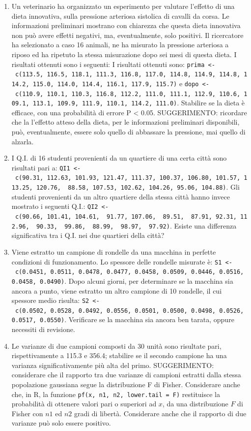 \documentclass[
  12pt,
]{book}
\begin{document}
\begin{enumerate}
\item
  Un veterinario ha organizzato un esperimento per valutare l'effetto di una dieta innovativa, sulla pressione arteriosa sistolica di cavalli da corsa. Le informazioni preliminari mostrano con chiarezza che questa dieta innovativa non può avere effetti negativi, ma, eventualmente, solo positivi. Il ricercatore ha selezionato a caso 16 animali, ne ha misurato la pressione arteriosa a riposo ed ha ripetuto la stessa misurazione dopo sei mesi di questa dieta. I risultati ottenuti sono i seguenti: I risultati ottenuti sono: \texttt{prima\ \textless{}-\ c(113.5,\ 116.5,\ 118.1,\ 111.3,\ 116.8,\ 117.0,\ 114.8,\ 114.9,\ 114.8,\ 114.2,\ 115.0,\ 114.0,\ 114.4,\ 116.1,\ 117.9,\ 115.7)} e \texttt{dopo\ \textless{}-\ c(110.9,\ 110.1,\ 110.3,\ 116.8,\ 112.2,\ 111.0,\ 111.1,\ 112.9,\ 110.6,\ 109.1,\ 113.1,\ 109.9,\ 111.9,\ 110.1,\ 114.2,\ 111.0)}. Stabilire se la dieta è efficace, con una probabilità di errore P \textless{} 0.05. SUGGERIMENTO: ricordare che la l'effetto atteso della dieta, per le informazioni preliminari disponibili, può, eventualmente, essere solo quello di abbassare la pressione, mai quello di alzarla.
\item
  I Q.I. di 16 studenti provenienti da un quartiere di una certa città sono risultati pari a: \texttt{QI1\ \textless{}-\ c(90.31,\ 112.63,\ 101.93,\ 121.47,\ 111.37,\ 100.37,\ 106.80,\ 101.57,\ 113.25,\ 120.76,\ \ 88.58,\ 107.53,\ 102.62,\ 104.26,\ 95.06,\ 104.88)}. Gli studenti provenienti da un altro quartiere della stessa città hanno invece mostrato i seguenti Q.I.: \texttt{QI2\ \textless{}-\ c(90.66,\ 101.41,\ 104.61,\ \ 91.77,\ 107.06,\ \ 89.51,\ \ 87.91,\ 92.31,\ 112.96,\ \ 90.33,\ \ 99.86,\ \ 88.99,\ \ 98.97,\ \ 97.92)}. Esiste una differenza significativa tra i Q.I. nei due quartieri della città?
\item
  Viene estratto un campione di rondelle da una macchina in perfette condizioni di funzionamento. Lo spessore delle rondelle misurate è: \texttt{S1\ \textless{}-\ c(0.0451,\ 0.0511,\ 0.0478,\ 0.0477,\ 0.0458,\ 0.0509,\ 0.0446,\ 0.0516,\ 0.0458,\ 0.0490)}. Dopo alcuni giorni, per determinare se la macchina sia ancora a punto, viene estratto un altro campione di 10 rondelle, il cui spessore medio risulta: \texttt{S2\ \textless{}-\ c(0.0502,\ 0.0528,\ 0.0492,\ 0.0556,\ 0.0501,\ 0.0500,\ 0.0498,\ 0.0526,\ 0.0517,\ 0.0550)}. Verificare se la macchina sia ancora ben tarata, oppure necessiti di revisione.
\item
  Le varianze di due campioni composti da 30 unità sono risultate pari, rispettivamente a 115.3 e 356.4; stabilire se il secondo campione ha una varianza significativamente più alta del primo. SUGGERIMENTO: considerare che il rapporto tra due varianze di campioni estratti dalla stessa popolazione gaussiana segue la distribuzione F di Fisher. Considerare anche che, in R, la funzione \texttt{pf(x,\ n1,\ n2,\ lower.tail\ =\ F)} restituisce la probabilità di ottenere valori pari o superiori ad \(x\), da una distribuzione \(F\) di Fisher con \(n1\) ed \(n2\) gradi di libertà. Considerare anche che il rapporto di due varianze può solo essere positivo.

\end{enumerate}
\end{document}
